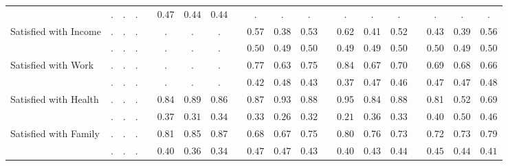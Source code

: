 \begin{landscape}
\begin{center}
{\begin{longtable}{L{5cm} c c c p{.5cm} c c c p{.5cm} c c c p{.5cm} c c c p{.5cm} c c c}
& $\mathit{        .}$ & $\mathit{        .}$ & $\mathit{        .}$ & & $\mathit{     0.47}$ & $\mathit{     0.44}$ & $\mathit{     0.44}$ & & $\mathit{        .}$ & $\mathit{        .}$ & $\mathit{        .}$ & & $\mathit{        .}$ & $\mathit{        .}$ & $\mathit{        .}$ & & $\mathit{        .}$ & $\mathit{        .}$ & $\mathit{        .}$ \\[1.6em]
Satisfied with Income & . &         . &         . & &         . &         . &         . & &      0.57 &      0.38 &      0.53 & &      0.62 &      0.41 &      0.52 & &      0.43 &      0.39 &      0.56 \\*
& $\mathit{        .}$ & $\mathit{        .}$ & $\mathit{        .}$ & & $\mathit{        .}$ & $\mathit{        .}$ & $\mathit{        .}$ & & $\mathit{     0.50}$ & $\mathit{     0.49}$ & $\mathit{     0.50}$ & & $\mathit{     0.49}$ & $\mathit{     0.49}$ & $\mathit{     0.50}$ & & $\mathit{     0.50}$ & $\mathit{     0.49}$ & $\mathit{     0.50}$ \\[1.6em]
Satisfied with Work & . &         . &         . & &         . &         . &         . & &      0.77 &      0.63 &      0.75 & &      0.84 &      0.67 &      0.70 & &      0.69 &      0.68 &      0.66 \\*
& $\mathit{        .}$ & $\mathit{        .}$ & $\mathit{        .}$ & & $\mathit{        .}$ & $\mathit{        .}$ & $\mathit{        .}$ & & $\mathit{     0.42}$ & $\mathit{     0.48}$ & $\mathit{     0.43}$ & & $\mathit{     0.37}$ & $\mathit{     0.47}$ & $\mathit{     0.46}$ & & $\mathit{     0.47}$ & $\mathit{     0.47}$ & $\mathit{     0.48}$ \\[1.6em]
Satisfied with Health & . &         . &         . & &      0.84 &      0.89 &      0.86 & &      0.87 &      0.93 &      0.88 & &      0.95 &      0.84 &      0.88 & &      0.81 &      0.52 &      0.69 \\*
& $\mathit{        .}$ & $\mathit{        .}$ & $\mathit{        .}$ & & $\mathit{     0.37}$ & $\mathit{     0.31}$ & $\mathit{     0.34}$ & & $\mathit{     0.33}$ & $\mathit{     0.26}$ & $\mathit{     0.32}$ & & $\mathit{     0.21}$ & $\mathit{     0.36}$ & $\mathit{     0.33}$ & & $\mathit{     0.40}$ & $\mathit{     0.50}$ & $\mathit{     0.46}$ \\[1.6em]
Satisfied with Family & . &         . &         . & &      0.81 &      0.85 &      0.87 & &      0.68 &      0.67 &      0.75 & &      0.80 &      0.76 &      0.73 & &      0.72 &      0.73 &      0.79 \\*
& $\mathit{        .}$ & $\mathit{        .}$ & $\mathit{        .}$ & & $\mathit{     0.40}$ & $\mathit{     0.36}$ & $\mathit{     0.34}$ & & $\mathit{     0.47}$ & $\mathit{     0.47}$ & $\mathit{     0.43}$ & & $\mathit{     0.40}$ & $\mathit{     0.43}$ & $\mathit{     0.44}$ & & $\mathit{     0.45}$ & $\mathit{     0.44}$ & $\mathit{     0.41}$ \\[1.6em]

\end{longtable}}
\end{center}
\end{landscape}

